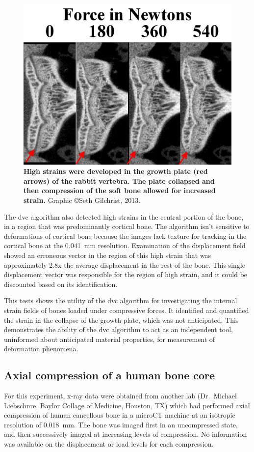 \begin{figure}
\centering
\includegraphics[width=.7\linewidth]{./appendixDvc/figures/RawImagesTogether}
\caption[Rabbit vertebra growth plate]{\textbf{High strains were developed in the growth plate (red arrows) of the rabbit vertebra. The plate collapsed and then compression of the soft bone allowed for increased strain.} Graphic \copyright Seth Gilchrist, 2013.}
\label{fig:RawImagesTogether}
\end{figure}

The \ac{dvc} algorithm also detected high strains in the central portion of the bone, in a region that was predominantly cortical bone.
The algorithm isn't sensitive to deformations of cortical bone because the images lack texture for tracking in the cortical bone at the 0.041~\ac{mm} resolution.
Examination of the displacement field showed an erroneous vector in the region of this high strain that was approximately 2.8x the average displacement in the rest of the bone.
This single displacement vector was responsible for the region of high strain, and it could be discounted based on its identification.

This tests shows the utility of the \ac{dvc} algorithm for investigating the internal strain fields of bones loaded under compressive forces.
It identified and quantified the strain in the collapse of the growth plate, which was not anticipated.
This demonstrates the ability of the \ac{dvc} algorithm to act as an independent tool, uninformed about anticipated material properties, for measurement of deformation phenomena.

\subsection{Axial compression of a human bone core}
\label{sec:dvc_results_human}
For this experiment, x-ray data were obtained from another lab (Dr.~Michael Liebschnre, Baylor Collage of Medicine, Houston, TX) which had performed axial compression of human cancellous bone in a microCT machine at an isotropic resolution of 0.018~\ac{mm}.
The bone was imaged first in an uncompressed state, and then successively imaged at increasing levels of compression.
No information was available on the displacement or load levels for each compression.

